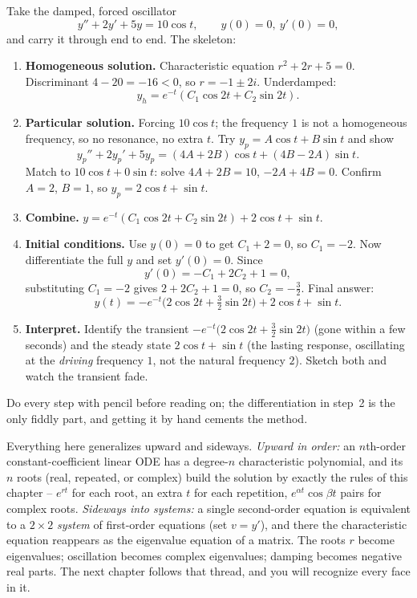 \begin{labbox}
Take the damped, forced oscillator
\[
  y'' + 2y' + 5y = 10\cos t, \qquad y(0) = 0,\ y'(0) = 0,
\]
and carry it through end to end. The skeleton:
\begin{enumerate}
  \item \textbf{Homogeneous solution.} Characteristic equation $r^2 + 2r + 5 =
  0$. Discriminant $4 - 20 = -16 < 0$, so $r = -1 \pm 2i$. Underdamped:
  \[
    y_h = e^{-t}(C_1 \cos 2t + C_2 \sin 2t).
  \]
  \item \textbf{Particular solution.} Forcing $10\cos t$; the frequency $1$ is
  not a homogeneous frequency, so no resonance, no extra $t$. Try $y_p = A\cos t +
  B\sin t$ and show
  \[
    y_p'' + 2y_p' + 5y_p = (4A + 2B)\cos t + (4B - 2A)\sin t.
  \]
  Match to $10\cos t + 0\sin t$: solve $4A + 2B = 10$, $-2A + 4B = 0$. Confirm
  $A = 2$, $B = 1$, so $y_p = 2\cos t + \sin t$.
  \item \textbf{Combine.} $y = e^{-t}(C_1\cos 2t + C_2\sin 2t) + 2\cos t + \sin t$.
  \item \textbf{Initial conditions.} Use $y(0)=0$ to get $C_1 + 2 = 0$, so $C_1 =
  -2$. Now differentiate the full $y$ and set $y'(0) = 0$. Since
  \[
    y'(0) = -C_1 + 2C_2 + 1 = 0,
  \]
  substituting $C_1 = -2$ gives $2 + 2C_2 + 1 = 0$, so $C_2 = -\tfrac32$. Final
  answer:
  \[
    y(t) = -e^{-t}\big(2\cos 2t + \tfrac32 \sin 2t\big) + 2\cos t + \sin t.
  \]
  \item \textbf{Interpret.} Identify the transient $-e^{-t}\big(2\cos 2t +
  \tfrac32\sin 2t\big)$ (gone within a few seconds) and the steady state $2\cos t
  + \sin t$ (the lasting response,
  oscillating at the \emph{driving} frequency $1$, not the natural frequency
  $2$). Sketch both and watch the transient fade.
\end{enumerate}
Do every step with pencil before reading on; the differentiation in step~2 is the
only fiddly part, and getting it by hand cements the method.
\end{labbox}

\begin{connectionbox}
Everything here generalizes upward and sideways. \emph{Upward in order:} an
$n$th-order constant-coefficient linear ODE has a degree-$n$ characteristic
polynomial, and its $n$ roots (real, repeated, or complex) build the solution by
exactly the rules of this chapter -- $e^{rt}$ for each root, an extra $t$ for each
repetition, $e^{\alpha t}\cos\beta t$ pairs for complex roots. \emph{Sideways into
systems:} a single second-order equation is equivalent to a $2\times 2$
\emph{system} of first-order equations (set $v = y'$), and there the
characteristic equation reappears as the eigenvalue equation of a matrix. The
roots $r$ become eigenvalues; oscillation becomes complex eigenvalues; damping
becomes negative real parts. The next chapter follows that thread, and you will
recognize every face in it.
\end{connectionbox}

